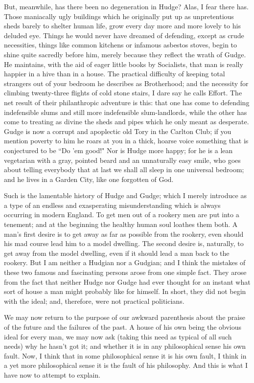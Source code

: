 \documentclass[final,10pt,letterpaper,twocolumn,openany]{book}
\begin{document}
But, meanwhile, has there been no degeneration in Hudge? Alas, I fear
there has. Those maniacally ugly buildings which he originally put up as
unpretentious sheds barely to shelter human life, grow every day more and
more lovely to his deluded eye. Things he would never have dreamed of
defending, except as crude necessities, things like common kitchens or
infamous asbestos stoves, begin to shine quite sacredly before him, merely
because they reflect the wrath of Gudge. He maintains, with the aid of
eager little books by Socialists, that man is really happier in a hive than in
a house. The practical difficulty of keeping total strangers out of your
bedroom he describes as Brotherhood; and the necessity for climbing
twenty-three flights of cold stone stairs, I dare say he calls Effort. The net
result of their philanthropic adventure is this: that one has come to
defending indefensible slums and still more indefensible slum-landlords,
while the other has come to treating as divine the sheds and pipes which
he only meant as desperate. Gudge is now a corrupt and apoplectic old
Tory in the Carlton Club; if you mention poverty to him he roars at you in
a thick, hoarse voice something that is conjectured to be ``Do 'em good!"
Nor is Hudge more happy; for he is a lean vegetarian with a gray, pointed
beard and an unnaturally easy smile, who goes about telling everybody
that at last we shall all sleep in one universal bedroom; and he lives in a
Garden City, like one forgotten of God.

Such is the lamentable history of Hudge and Gudge; which I merely
introduce as a type of an endless and exasperating misunderstanding
which is always occurring in modern England. To get men out of a
rookery men are put into a tenement; and at the beginning the healthy
human soul loathes them both. A man's first desire is to get away as far as
possible from the rookery, even should his mad course lead him to a model
dwelling. The second desire is, naturally, to get away from the model
dwelling, even if it should lead a man back to the rookery. But I am
neither a Hudgian nor a Gudgian; and I think the mistakes of these two
famous and fascinating persons arose from one simple fact. They arose
from the fact that neither Hudge nor Gudge had ever thought for an instant
what sort of house a man might probably like for himself. In short, they
did not begin with the ideal; and, therefore, were not practical politicians.

We may now return to the purpose of our awkward parenthesis about
the praise of the future and the failures of the past. A house of his own
being the obvious ideal for every man, we may now ask (taking this need
as typical of all such needs) why he hasn't got it; and whether it is in any
philosophical sense his own fault. Now, I think that in some philosophical
sense it is his own fault, I think in a yet more philosophical sense it is the
fault of his philosophy. And this is what I have now to attempt to explain.
\end{document}
